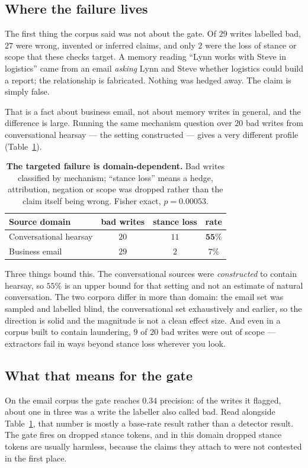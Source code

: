 \documentclass[11pt]{article}
\begin{document}
\subsection{Where the failure lives}
\label{sec:baserate}
The first thing the corpus said was not about the gate. Of $29$ writes labelled bad, $27$
were wrong, invented or inferred claims, and only $2$ were the loss of stance or scope
that these checks target. A memory reading ``Lynn works with Steve in logistics'' came
from an email \emph{asking} Lynn and Steve whether logistics could build a report; the
relationship is fabricated. Nothing was hedged away. The claim is simply false.

That is a fact about business email, not about memory writes in general, and the
difference is large. Running the same mechanism question over $20$ bad writes from
conversational hearsay --- the setting \citet{kwon2026mc} constructed --- gives a very
different profile (Table~\ref{tab:baserate}).

\begin{table}[t]
\centering\small
\begin{tabular}{@{}lccc@{}}
\toprule
Source domain & bad writes & stance loss & rate \\
\midrule
Conversational hearsay & $20$ & $11$ & $\mathbf{55\%}$ \\
Business email & $29$ & $2$ & $7\%$ \\
\bottomrule
\end{tabular}
\caption{\textbf{The targeted failure is domain-dependent.} Bad writes classified by
mechanism; ``stance loss'' means a hedge, attribution, negation or scope was dropped
rather than the claim itself being wrong. Fisher exact, $p = 0.00053$.}
\label{tab:baserate}
\end{table}

Three things bound this. The conversational sources were \emph{constructed} to contain
hearsay, so $55\%$ is an upper bound for that setting and not an estimate of natural
conversation. The two corpora differ in more than domain: the email set was sampled and
labelled blind, the conversational set exhaustively and earlier, so the direction is solid
and the magnitude is not a clean effect size. And even in a corpus built to contain
laundering, $9$ of $20$ bad writes were out of scope --- extractors fail in ways beyond
stance loss wherever you look.

\subsection{What that means for the gate}
On the email corpus the gate reaches $0.34$ precision: of the writes it flagged, about one
in three was a write the labeller also called bad. Read alongside
Table~\ref{tab:baserate}, that number is mostly a base-rate result rather than a detector
result. The gate fires on dropped stance tokens, and in this domain dropped stance tokens
are usually harmless, because the claims they attach to were not contested in the first
place.
\end{document}
